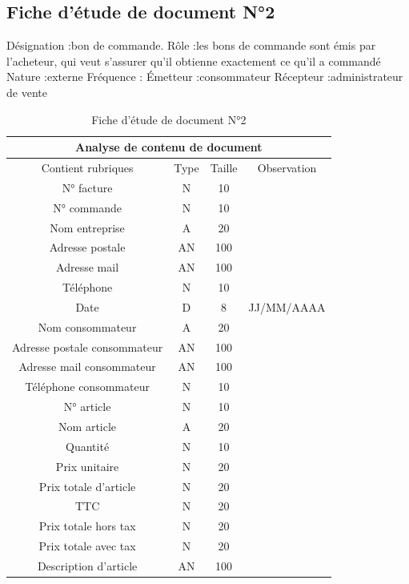 \documentclass[edit,12pt,a4paper,ChapStyle,oneside,doubleinterligne]{report}
\begin{document}
\subsection{Fiche d’étude de document N°2}
Désignation :bon de commande.
\newline Rôle :les bons de commande sont émis par l’acheteur, qui veut s’assurer qu’il obtienne exactement ce qu’il a commandé
\newline Nature :externe
\newline Fréquence :
\newline Émetteur :consommateur
\newline Récepteur :administrateur de vente \cite{Bonc}
\begin{table}[h!]
    \centering
    \begin{tabular}{|c|c|c|c|}
         \hline
\multicolumn{4}{|c|}{Analyse de contenu de document}\\
\hline
Contient rubriques & Type & Taille & Observation\\
\hline
 N° facture  & N & 10 & \\
 N° commande  & N & 10 & \\
 Nom entreprise & A & 20 & \\
 Adresse postale & AN & 100 & \\
 Adresse mail & AN & 100 & \\
 Téléphone & N & 10 & \\
Date & D & 8 & JJ/MM/AAAA \\
Nom consommateur & A & 20 & \\
Adresse postale consommateur & AN & 100 & \\
Adresse mail consommateur & AN & 100 & \\
Téléphone consommateur & N & 10 & \\
N° article & N & 10 & \\
Nom article & A & 20 & \\
Quantité & N & 10 & \\
Prix unitaire & N & 20 & \\
Prix totale d’article & N & 20 & \\
TTC & N & 20 & \\
Prix totale hors tax & N & 20 & \\
Prix totale avec tax & N & 20 & \\
Description d’article & AN & 100 & \\
\hline
    \end{tabular}
    \caption{Fiche d’étude de document N°2}
    \label{tab:2}
\end{table}
\end{document}
